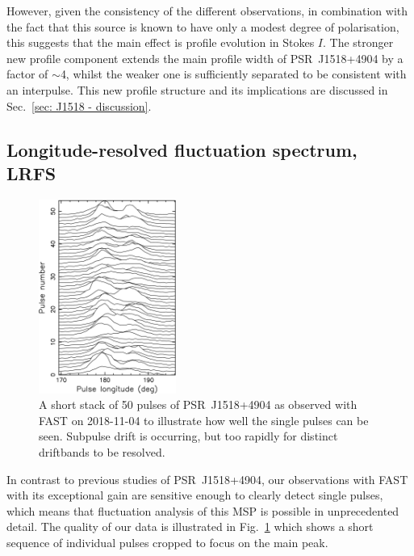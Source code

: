 However, given the consistency of the different observations, in combination with the fact that this source is known to have only a modest degree of polarisation, this suggests that the main effect is profile evolution in Stokes $I$. The stronger new profile component extends the main profile width of PSR~J1518+4904 by a factor of $\sim$4, whilst the weaker one is sufficiently separated to be consistent with an interpulse. This new profile structure and its implications are discussed in Sec.~\ref{sec: J1518 - discussion}.








\subsection{Longitude-resolved fluctuation spectrum, LRFS}
\label{sec: J1518 - analysis - LRFS}

\begin{figure}
    \begin{center}
        \includegraphics[width=0.4\textwidth]{Figures/J1518/stack_joy.png}
        \caption[Single pulses of PSR~J1518+4904]{A short stack of 50 pulses of PSR~J1518+4904 as observed with FAST on 2018-11-04 to illustrate how well the single pulses can be seen. Subpulse drift is occurring, but too rapidly for distinct driftbands to be resolved.}
        \label{fig: J1518 - short stack}
    \end{center}
\end{figure}
In contrast to previous studies of PSR~J1518+4904, our observations with FAST with its exceptional gain are sensitive enough to clearly detect single pulses, which means that fluctuation analysis of this MSP is possible in unprecedented detail. The quality of our data is illustrated in Fig.~\ref{fig: J1518 - short stack} which shows a short sequence of individual pulses cropped to focus on the main peak.

